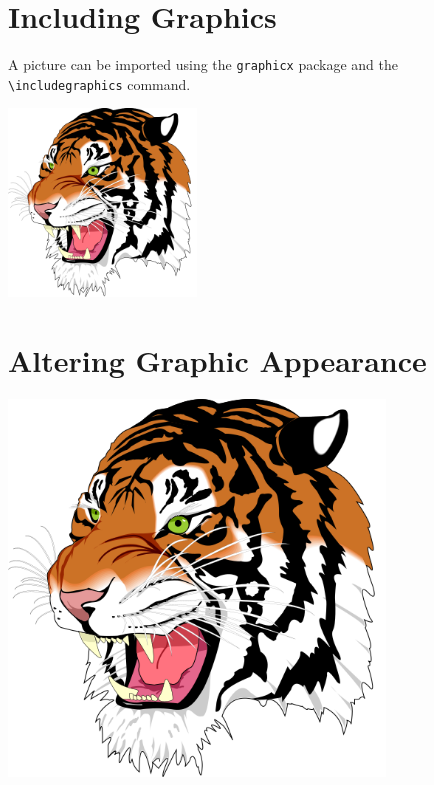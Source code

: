 \documentclass{article}
\begin{document}
\section{Including Graphics}

A picture can be imported using the \verb|graphicx| package
and the \verb|\includegraphics| command.

\begin{center}
  \includegraphics[height=5cm]{Ghostscript_Tiger-512px}
\end{center}

\section{Altering Graphic Appearance}

\begin{center}
  \includegraphics[width = 10cm]{Ghostscript_Tiger-512px}
\end{center}
\end{document}

